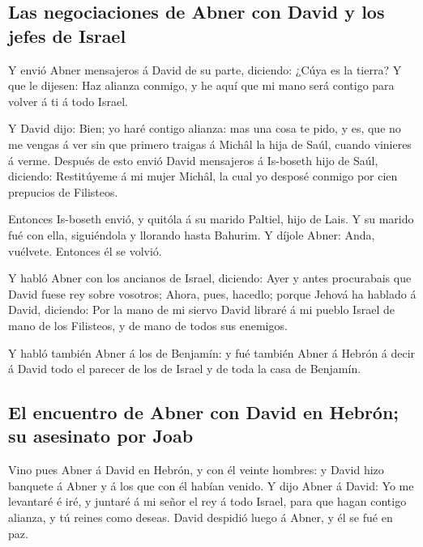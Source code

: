 \hypertarget{las-negociaciones-de-abner-con-david-y-los-jefes-de-israel}{%
\subsection{Las negociaciones de Abner con David y los jefes de
Israel}\label{las-negociaciones-de-abner-con-david-y-los-jefes-de-israel}}

 Y envió Abner mensajeros á David de su parte, diciendo:
¿Cúya es la tierra? Y que le dijesen: Haz alianza conmigo, y he aquí que
mi mano será contigo para volver á ti á todo Israel.

 Y David dijo: Bien; yo haré contigo alianza: mas una
cosa te pido, y es, que no me vengas á ver sin que primero traigas á
Michâl la hija de Saúl, cuando vinieres á verme.  Después
de esto envió David mensajeros á Is-boseth hijo de Saúl, diciendo:
Restitúyeme á mi mujer Michâl, la cual yo desposé conmigo por cien
prepucios de Filisteos.

 Entonces Is-boseth envió, y quitóla á su marido Paltiel,
hijo de Lais.  Y su marido fué con ella, siguiéndola y
llorando hasta Bahurim. Y díjole Abner: Anda, vuélvete. Entonces él se
volvió.

 Y habló Abner con los ancianos de Israel, diciendo: Ayer
y antes procurabais que David fuese rey sobre vosotros; 
Ahora, pues, hacedlo; porque Jehová ha hablado á David, diciendo: Por la
mano de mi siervo David libraré á mi pueblo Israel de mano de los
Filisteos, y de mano de todos sus enemigos.

 Y habló también Abner á los de Benjamín: y fué también
Abner á Hebrón á decir á David todo el parecer de los de Israel y de
toda la casa de Benjamín.

\hypertarget{el-encuentro-de-abner-con-david-en-hebruxf3n-su-asesinato-por-joab}{%
\subsection{El encuentro de Abner con David en Hebrón; su asesinato por
Joab}\label{el-encuentro-de-abner-con-david-en-hebruxf3n-su-asesinato-por-joab}}

 Vino pues Abner á David en Hebrón, y con él veinte
hombres: y David hizo banquete á Abner y á los que con él habían venido.
 Y dijo Abner á David: Yo me levantaré é iré, y juntaré á
mi señor el rey á todo Israel, para que hagan contigo alianza, y tú
reines como deseas. David despidió luego á Abner, y él se fué en paz.

